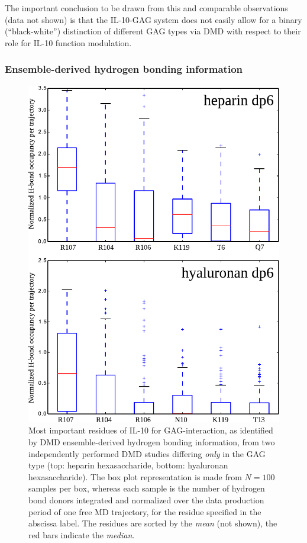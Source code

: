 The important conclusion to be drawn from this and comparable observations (data
not shown) is that the IL-10-GAG system does not easily allow for a binary
(\enquote{black-white}) distinction of different GAG types via DMD with respect
to their role for IL-10 function modulation.


\subsubsection{Ensemble-derived hydrogen bonding information}

\begin{figure}
\centering
\includegraphics[width=1.0\textwidth]{gfx/dmdil10/round1_il10_hbond_hadp6_vs_hpdp6.pdf}
\caption[]{Most important residues of IL-10 for GAG-interaction, as identified
by DMD ensemble-derived hydrogen bonding information, from two independently
performed DMD studies differing \textit{only} in the GAG type (top: heparin
hexasaccharide, bottom: hyaluronan hexasaccharide). The box plot representation
is made from  $N=100$ samples per box, whereas each sample is the number of
hydrogen bond donors integrated and normalized over the data production period
of one free MD trajectory, for the residue specified in the abscissa label.
The residues are sorted by the \textit{mean} (not shown), the red bars indicate
the \textit{median}.}
\label{fig:dmdil10:hp_hexa_vs_ha_hexa_hbond}
\end{figure}


